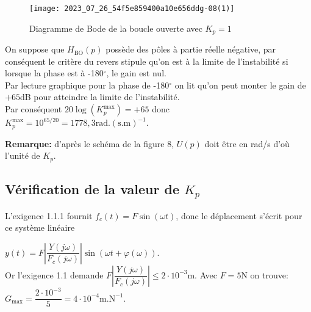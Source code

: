 \begin{figure}[!h]
\centering
\texttt{[image: 2023\_07\_26\_54f5e859400a10e656ddg-08(1)]}
\caption{\label{fig_ccspsi2022:12}Diagramme de Bode de la boucle ouverte avec $K_{p}=1$}
\end{figure}

\ifprof
\begin{corrige}
On suppose que $H_{\text{BO}}(p)$ possède des pôles à partie réelle négative, par conséquent le critère du revers stipule qu'on est à la limite de l'instabilité si lorsque la phase est à -180$^\circ$, le gain est nul.\\

Par lecture graphique pour la phase de -180$^\circ$ on lit qu'on peut monter le gain de $+65$dB pour atteindre la limite de l'instabilité.\\

Par conséquent $20\log(K_p^{\text{max}}) = +65$ donc $\boxed{K_p^{\text{max}} = 10^{65/20} = 1778,3\text{rad}.(\text{s.m})^{-1}}$.

\textbf{Remarque:} d'après le schéma de la figure 8, $U(p)$ doit être en rad/s d'où l'unité de $K_p$.
\end{corrige}
\else
\fi

\subsection{\label{sec:III.B} Vérification de la valeur de $K_{p}$}
\ifprof
\begin{corrige}
L'exigence 1.1.1 fournit $f_c(t) = F \sin(\omega t)$, donc le déplacement s'écrit pour ce système linéaire 

$y(t) = F \left| \dfrac{Y(j\omega)}{F_c(j\omega)} \right| \sin(\omega t + \varphi(\omega))$.\\ 

Or l'exigence 1.1 demande $F \left| \dfrac{Y(j\omega)}{F_c(j\omega)} \right|\leq 2\cdot 10^{-3}$m. Avec $F = 5$N on trouve: $\boxed{G_{\text{max}} = \dfrac{2\cdot 10^{-3}}{5} = 4\cdot 10^{-4}\text{m}.\text{N}^{-1}}$.
\end{corrige}
\else
\fi

